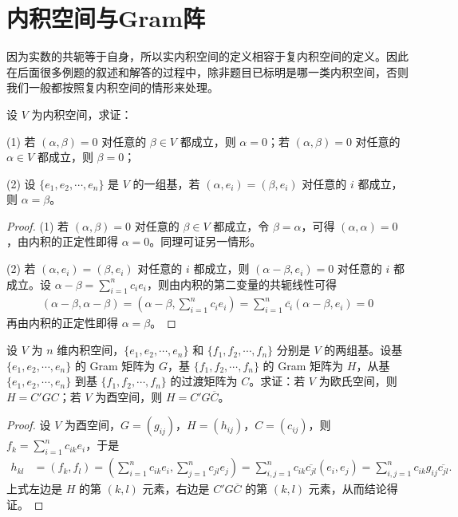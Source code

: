 \documentclass[../../main.tex]{subfiles}
\begin{document}
\section{内积空间与Gram阵}

\begin{remark}
因为实数的共轭等于自身，所以实内积空间的定义相容于复内积空间的定义。因此在后面很多例题的叙述和解答的过程中，除非题目已标明是哪一类内积空间，否则我们一般都按照复内积空间的情形来处理。
\end{remark}

\begin{proposition}\label{proposition:例9.2}
设 $V$ 为内积空间，求证：

(1) 若 $(\alpha,\beta)=0$ 对任意的 $\beta\in V$ 都成立，则 $\alpha = 0$；若 $(\alpha,\beta)=0$ 对任意的 $\alpha\in V$ 都成立，则 $\beta = 0$；

(2) 设 $\{e_1,e_2,\cdots,e_n\}$ 是 $V$ 的一组基，若 $(\alpha,e_i)=(\beta,e_i)$ 对任意的 $i$ 都成立，则 $\alpha = \beta$。
\end{proposition}
\begin{proof}
(1) 若 $(\alpha,\beta)=0$ 对任意的 $\beta\in V$ 都成立，令 $\beta = \alpha$，可得 $(\alpha,\alpha)=0$，由内积的正定性即得 $\alpha = 0$。同理可证另一情形。

(2) 若 $(\alpha,e_i)=(\beta,e_i)$ 对任意的 $i$ 都成立，则 $(\alpha - \beta,e_i)=0$ 对任意的 $i$ 都成立。设 $\alpha - \beta = \sum_{i = 1}^{n}c_ie_i$，则由内积的第二变量的共轭线性可得
\begin{align*}
(\alpha - \beta,\alpha - \beta)=(\alpha - \beta,\sum_{i = 1}^{n}c_ie_i)=\sum_{i = 1}^{n}\overline{c_i}(\alpha - \beta,e_i)=0
\end{align*}
再由内积的正定性即得 $\alpha = \beta$。

\end{proof}

\begin{proposition}\label{proposition:例9.3}
设 $V$ 为 $n$ 维内积空间，$\{e_1,e_2,\cdots,e_n\}$ 和 $\{f_1,f_2,\cdots,f_n\}$ 分别是 $V$ 的两组基。设基 $\{e_1,e_2,\cdots,e_n\}$ 的 Gram 矩阵为 $G$，基 $\{f_1,f_2,\cdots,f_n\}$ 的 Gram 矩阵为 $H$，从基 $\{e_1,e_2,\cdots,e_n\}$ 到基 $\{f_1,f_2,\cdots,f_n\}$ 的过渡矩阵为 $C$。求证：若 $V$ 为欧氏空间，则 $H = C'GC$；若 $V$ 为酉空间，则 $H = C' G\overline{C}$。
\end{proposition}
\begin{proof}
设 $V$ 为酉空间，$G = (g_{ij})$，$H = (h_{ij})$，$C = (c_{ij})$，则 $f_k = \sum_{i = 1}^{n}c_{ik}e_i$，于是
\begin{align*}
h_{kl}&=(f_k,f_l)=(\sum_{i = 1}^{n}c_{ik}e_i,\sum_{j = 1}^{n}c_{jl}e_j)=\sum_{i,j = 1}^{n}c_{ik}\overline{c_{jl}}(e_i,e_j)=\sum_{i,j = 1}^{n}c_{ik}g_{ij}\overline{c_{jl}}.
\end{align*}
上式左边是 $H$ 的第 $(k, l)$ 元素，右边是 $C' G\overline{C}$ 的第 $(k, l)$ 元素，从而结论得证。

\end{proof}
\end{document}

